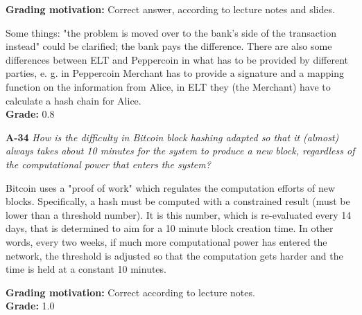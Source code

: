 \documentclass[a4paper]{article}
\newcommand{\Q}[2]{
  \vspace{10pt} \textbf{#1} \textit{#2}
 }
\newcommand{\A}[1]{ #1 }
\newcommand{\Grade}[2]{ 
  \textbf{Grading motivation:} #2 \\ 
  \hspace*{\fill} \textbf{Grade:} #1 
}
\begin{document}
\Grade{0.8}{
  Correct answer, according to lecture notes and slides.

  Some things: "the problem is moved over to the bank's side
  of the transaction instead" could be clarified; the bank pays the 
  difference. There are also some differences between ELT and Peppercoin in 
  what has to be provided by different parties, e. g. in Peppercoin
  Merchant has to provide a signature and a mapping function on the information
  from Alice, in ELT they (the Merchant) have to calculate a hash chain for 
  Alice.
}

\Q{A-34} {How  is  the  difficulty  in  Bitcoin  block  hashing  adapted  so  that  it  
(almost)  always  takes  about  10 minutes for the system to produce a new block, 
regardless of the computational power that enters the system?}

\A{
  Bitcoin uses a "proof of work" which regulates the computation efforts of new blocks.
  Specifically, a hash must be computed with a constrained result (must be lower than a threshold
  number). It is this number, which is re-evaluated every 14 days, that is determined to aim for a
  10 minute block creation time. In other words, every two weeks, if much more computational
  power has entered the network, the threshold is adjusted so that the computation gets harder
  and the time is held at a constant 10 minutes.
}

\Grade{1.0}{
  Correct according to lecture notes.
}
\end{document}
